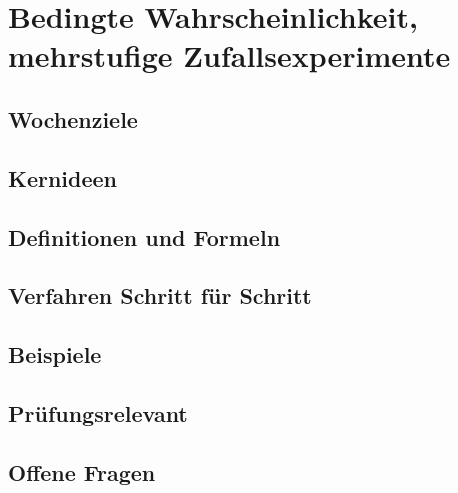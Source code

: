 \chapter{Bedingte Wahrscheinlichkeit, mehrstufige Zufallsexperimente}
\label{kap:serie02}

\section*{Wochenziele}
\begin{wochenziele}
\end{wochenziele}

\section{Kernideen}

\section{Definitionen und Formeln}

\section{Verfahren Schritt für Schritt}

\section{Beispiele}

\section{Prüfungsrelevant}

\section{Offene Fragen}
